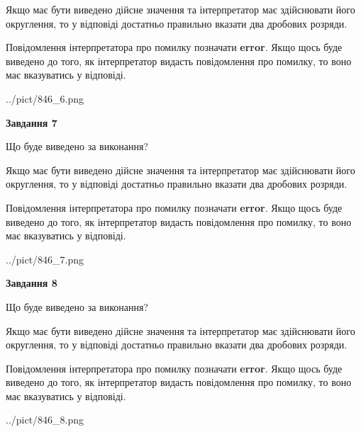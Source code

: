 \documentclass[12pt, ukrainian]{article}
\begin{document}
{\begin {Large}
Якщо має бути виведено дійсне значення та інтерпретатор має здійснювати його округлення, 
то у відповіді достатньо правильно вказати два дробових розряди.

Повідомлення інтерпретатора про помилку позначати \textbf{error}.
Якщо щось буде виведено до того, як інтерпретатор видасть повідомлення про помилку, 
то воно має вказуватись у відповіді. \par

\begin{center}
	{../pict/846_6.png}
\end{center}
\newpage

{\begin {center}\textbf{Завдання 7}\end {center}}\par
Що буде виведено за виконання? \par

Якщо має бути виведено дійсне значення та інтерпретатор має здійснювати його округлення, 
то у відповіді достатньо правильно вказати два дробових розряди.

Повідомлення інтерпретатора про помилку позначати \textbf{error}.
Якщо щось буде виведено до того, як інтерпретатор видасть повідомлення про помилку, 
то воно має вказуватись у відповіді. \par

\begin{center}
	{../pict/846_7.png}
\end{center}
\newpage

{\begin {center}\textbf{Завдання 8}\end {center}}\par
Що буде виведено за виконання? \par

Якщо має бути виведено дійсне значення та інтерпретатор має здійснювати його округлення, 
то у відповіді достатньо правильно вказати два дробових розряди.

Повідомлення інтерпретатора про помилку позначати \textbf{error}.
Якщо щось буде виведено до того, як інтерпретатор видасть повідомлення про помилку, 
то воно має вказуватись у відповіді. \par

\begin{center}
	{../pict/846_8.png}
\end{center}
\newpage


\end{Large}}
\end{document}
